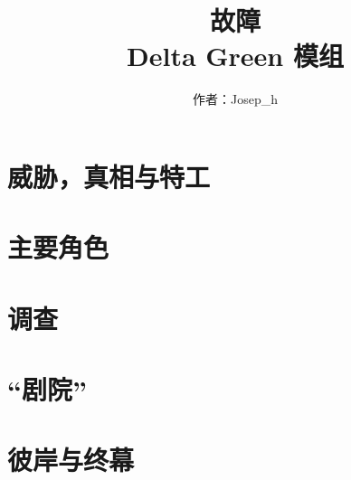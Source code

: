 \documentclass[letterpaper,twocolumn,nodeprecatedcode, oneside, AutoFakeBold, 10pt]{dndbook}
\title{\Huge 故障 \\
\Large Delta Green 模组}
\author{作者：Josep\_h}
\date{}
\begin{document}


% 





\mainmatter

\chapter{威胁，真相与特工}





% 

\chapter{主要角色}

% 

\chapter{调查}
% 
% 












\chapter{“剧院”}


\chapter{彼岸与终幕}


\appendix







% 
\end{document}
